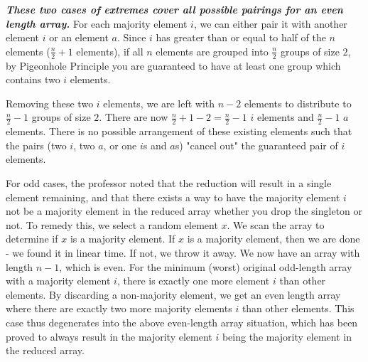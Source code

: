 \documentclass{article}
\begin{document}
\begin{enumerate}
\begin{enumerate}
\begin{enumerate}
                        \hfill \break
                        \textbf{\textit{These two cases of extremes cover all possible pairings for an even
                        length array.}} For each majority element $i$, we can either pair it 
                        with another element $i$ or an element $a$. Since $i$ has greater than or equal to 
                        half of the $n$ elements ($\frac{n}{2} + 1$ elements), 
                        if all $n$ elements are grouped into $\frac{n}{2}$ groups of size $2$, by Pigeonhole 
                        Principle you are guaranteed to have at least one group which contains two $i$ elements.
                        
                        \hfill \break
                        Removing these two $i$ elements, we are left with $n - 2$ elements to distribute to 
                        $\frac{n}{2} - 1$ groups of size $2$. There are now $\frac{n}{2} + 1 - 2 =  \frac{n}{2} - 1$
                        $i$ elements and $\frac{n}{2} - 1$ $a$ elements. There is no possible arrangement of these 
                        existing elements such that the pairs (two $i$, two $a$, or one $i$s and $a$s) 
                        "cancel out" the guaranteed pair of $i$ elements. 
                        
                        \hfill \break
                        For odd cases, the professor noted that the reduction will result in
                        a single element remaining, and that there exists a way to have the majority
                        element $i$ not be a majority element in the reduced array whether you drop the
                        singleton or not. To remedy this, we select a random element $x$. 
                        We scan the array to determine if $x$ is a majority element. 
                        If $x$ is a majority element, then we are done - we found it in linear time.
                        If not, we throw it away. We now have an array with length $n-1$, which is even. 
                        For the minimum (worst) original odd-length array with a majority element $i$, there is exactly
                        one more element $i$ than other elements. By discarding a non-majority element, 
                        we get an even length array where there are exactly two more majority elements $i$
                        than other elements. This case thus degenerates into the above even-length array
                        situation, which has been proved to always result in the majority element $i$ being
                        the majority element in the reduced array.
                        

\end{enumerate}
\end{enumerate}
\end{enumerate}
\end{document}
